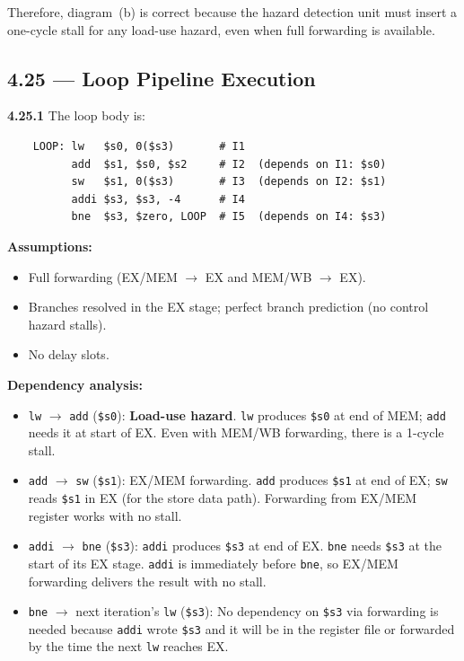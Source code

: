 Therefore, diagram~(b) is correct because the hazard detection unit must
insert a one-cycle stall for any load-use hazard, even when full forwarding
is available.

\subsection*{4.25 --- Loop Pipeline Execution}
\hypertarget{sol-4.25}{}

\medskip\noindent\textbf{4.25.1}
The loop body is:
\begin{verbatim}
    LOOP: lw   $s0, 0($s3)       # I1
          add  $s1, $s0, $s2     # I2  (depends on I1: $s0)
          sw   $s1, 0($s3)       # I3  (depends on I2: $s1)
          addi $s3, $s3, -4      # I4
          bne  $s3, $zero, LOOP  # I5  (depends on I4: $s3)
\end{verbatim}

\noindent \textbf{Assumptions:}
\begin{itemize}
  \item Full forwarding (EX/MEM $\to$ EX and MEM/WB $\to$ EX).
  \item Branches resolved in the EX stage; perfect branch prediction (no
        control hazard stalls).
  \item No delay slots.
\end{itemize}

\noindent \textbf{Dependency analysis:}
\begin{itemize}
  \item \texttt{lw} $\to$ \texttt{add} (\texttt{\$s0}):  \textbf{Load-use
        hazard}.  \texttt{lw} produces \texttt{\$s0} at end of MEM;
        \texttt{add} needs it at start of EX.  Even with MEM/WB forwarding,
        there is a 1-cycle stall.
  \item \texttt{add} $\to$ \texttt{sw} (\texttt{\$s1}):  EX/MEM forwarding.
        \texttt{add} produces \texttt{\$s1} at end of EX; \texttt{sw} reads
        \texttt{\$s1} in EX (for the store data path).  Forwarding from
        EX/MEM register works with no stall.
  \item \texttt{addi} $\to$ \texttt{bne} (\texttt{\$s3}):  \texttt{addi}
        produces \texttt{\$s3} at end of EX.  \texttt{bne} needs \texttt{\$s3}
        at the start of its EX stage.  \texttt{addi} is immediately before
        \texttt{bne}, so EX/MEM forwarding delivers the result with no stall.
  \item \texttt{bne} $\to$ next iteration's \texttt{lw} (\texttt{\$s3}):
        No dependency on \texttt{\$s3} via forwarding is needed because
        \texttt{addi} wrote \texttt{\$s3} and it will be in the register file
        or forwarded by the time the next \texttt{lw} reaches EX.
\end{itemize}

